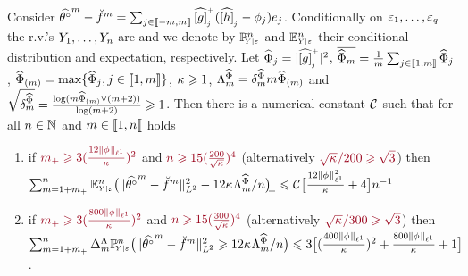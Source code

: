 \begin{lm}\label{re:crest}Consider  
$\hxdfPr-\dxdfPr=\sum_{j\in\nset{-\Di,\Di}}\hfedfmpI[j](\hfydf[j]-\fydf[j])\bas_j$.
Conditionally on $\rE_1,\dotsc,\rE_{\ssE}$ the r.v.'s
$\rY_1,\dotsc,\rY_{\ssY}$ are \iid and we  denote by $\FuVg[\ssY]{\rY|\rE}$ and $\FuEx[\ssY]{\rY|\rE}$ their conditional
 distribution and expectation, respectively. 
Let $\eiSv[j]=|\hfedfmpI[j]|^2$,
$\oeiSv=\tfrac{1}{\Di}\sum_{j\in\nset{1,\Di}}\eiSv[j]$, $\meiSv=
  \max\{\eiSv[j],j\in\nset{1,\Di}\}$, $\cpen\geq1$, $\DiepenSv=\cmeiSv\Di \meiSv$
 and $\sqrt{\cmeiSv}=\tfrac{\log (\Di\meiSv \vee (\Di+2))}{\log(\Di+2)}\geq1$.  Then there is a numerical constant $\cst{}$ such
 that for all $\ssY\in\Nz$ and $\Di\in\nsetro{1,\ssY}$ holds
\begin{enumerate}[label=\emph{\textbf{(\roman*)}},ref=\emph{\textbf{(\roman*)}}]\addtocounter{enumi}{0}
\item\label{re:crest:i} if $\dr\pDi\geq
  3(\tfrac{12\Vnormlp[1]{\fydf}}{\cpen})^2$ and $\dr n\geq
  15(\tfrac{200}{\sqrt{\cpen}})^4$
   (alternatively $\dr\sqrt{\cpen}/200\geq\sqrt{3}$) then\\ 
  $\sum_{\Di=1+\pDi}^{\ssY}\FuEx[\ssY]{\rY|\rE}\vectp{\VnormLp{\hxdfPr[\Di]-\dxdfPr[\Di]}^2-12\cpen\DiepenSv/\ssY}\leq \cst{}\big[\tfrac{12\Vnormlp[1]{\fydf}^2}{\cpen}+4\big]\ssY^{-1}$
\item\label{re:crest:ii} if
  $\dr\pDi\geq3(\tfrac{800\Vnormlp[1]{\fydf}}{\cpen})^2$ and
  $\dr n\geq
  15(\tfrac{300}{\sqrt{\cpen}})^4$ (alternatively $\dr\sqrt{\cpen}/300\geq\sqrt{3}$) then\\
  $\sum_{\Di=1+\pDi}^{\ssY}\DipenSv[\Di]\FuVg[\ssY]{\rY|\rE}\big(\VnormLp{\hxdfPr[\Di]-\dxdfPr[\Di]}^2\geq12\cpen\DiepenSv/\ssY\big)\leq3\big[
(\tfrac{400\Vnormlp[1]{\fydf}}{\cpen})^2+\tfrac{800\Vnormlp[1]{\fydf}}{\cpen}
+ 1\big]$.
\end{enumerate}
\end{lm}
